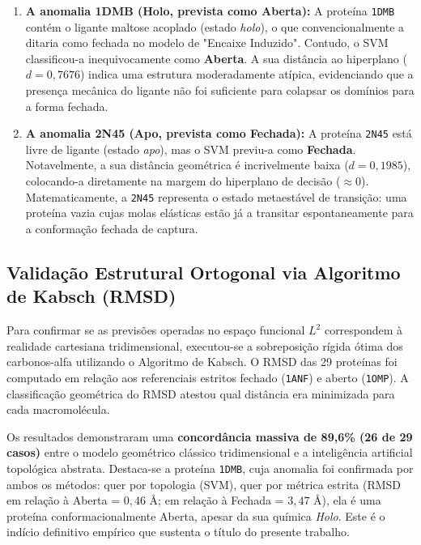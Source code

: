 \documentclass[12pt, a4paper]{article}
\begin{document}
\begin{enumerate}
    \item \textbf{A anomalia 1DMB (Holo, prevista como Aberta):} A proteína \texttt{1DMB} contém o ligante maltose acoplado (estado \textit{holo}), o que convencionalmente a ditaria como fechada no modelo de "Encaixe Induzido". Contudo, o SVM classificou-a inequivocamente como \textbf{Aberta}. A sua distância ao hiperplano ($d = 0,7676$) indica uma estrutura moderadamente atípica, evidenciando que a presença mecânica do ligante não foi suficiente para colapsar os domínios para a forma fechada.
    \item \textbf{A anomalia 2N45 (Apo, prevista como Fechada):} A proteína \texttt{2N45} está livre de ligante (estado \textit{apo}), mas o SVM previu-a como \textbf{Fechada}. Notavelmente, a sua distância geométrica é incrivelmente baixa ($d = 0,1985$), colocando-a diretamente na margem do hiperplano de decisão ($\approx 0$). Matematicamente, a \texttt{2N45} representa o estado metaestável de transição: uma proteína vazia cujas molas elásticas estão já a transitar espontaneamente para a conformação fechada de captura.
\end{enumerate}

\subsection{Validação Estrutural Ortogonal via Algoritmo de Kabsch (RMSD)}
\label{subsec:res_rmsd}

Para confirmar se as previsões operadas no espaço funcional $L^2$ correspondem à realidade cartesiana tridimensional, executou-se a sobreposição rígida ótima dos carbonos-alfa utilizando o Algoritmo de Kabsch. O RMSD das 29 proteínas foi computado em relação aos referenciais estritos fechado (\texttt{1ANF}) e aberto (\texttt{1OMP}). A classificação geométrica do RMSD atestou qual distância era minimizada para cada macromolécula.

Os resultados demonstraram uma \textbf{concordância massiva de 89,6\% (26 de 29 casos)} entre o modelo geométrico clássico tridimensional e a inteligência artificial topológica abstrata. Destaca-se a proteína \texttt{1DMB}, cuja anomalia foi confirmada por ambos os métodos: quer por topologia (SVM), quer por métrica estrita (RMSD em relação à Aberta = $0,46$ \AA; em relação à Fechada = $3,47$ \AA), ela é uma proteína conformacionalmente Aberta, apesar da sua química \textit{Holo}. Este é o indício definitivo empírico que sustenta o título do presente trabalho.
\end{document}
